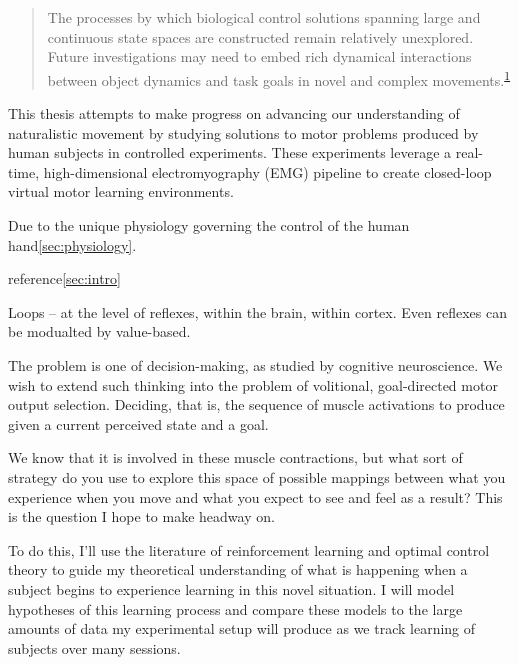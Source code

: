 {            \begin{quote}
            The processes by which biological control solutions spanning
            large and continuous state spaces are constructed remain
            relatively unexplored. Future investigations may need to
            embed rich dynamical interactions between object dynamics
            and task goals in novel and complex
            movements.\textsuperscript{\protect\hyperlink{ref-McNamee2019}{1}}
            \end{quote}

            This thesis attempts to make progress on advancing our
            understanding of naturalistic movement by studying solutions
            to motor problems produced by human subjects in controlled
            experiments. These experiments leverage a real-time,
            high-dimensional electromyography (EMG) pipeline to create
            closed-loop virtual motor learning environments.

            Due to the unique physiology governing the control of the
            human hand\cref{sec:physiology}.

            reference\cref{sec:intro}

            Loops -- at the level of reflexes, within the brain, within
            cortex. Even reflexes can be modualted by value-based.

            The problem is one of decision-making, as studied by
            cognitive neuroscience. We wish to extend such thinking into
            the problem of volitional, goal-directed motor output
            selection. Deciding, that is, the sequence of muscle
            activations to produce given a current perceived state and a
            goal.

            We know that it is involved in these muscle contractions,
            but what sort of strategy do you use to explore this space
            of possible mappings between what you experience when you
            move and what you expect to see and feel as a result? This
            is the question I hope to make headway on.

            To do this, I'll use the literature of reinforcement
            learning and optimal control theory to guide my theoretical
            understanding of what is happening when a subject begins to
            experience learning in this novel situation. I will model
            hypotheses of this learning process and compare these models
            to the large amounts of data my experimental setup will
            produce as we track learning of subjects over many sessions.

}
